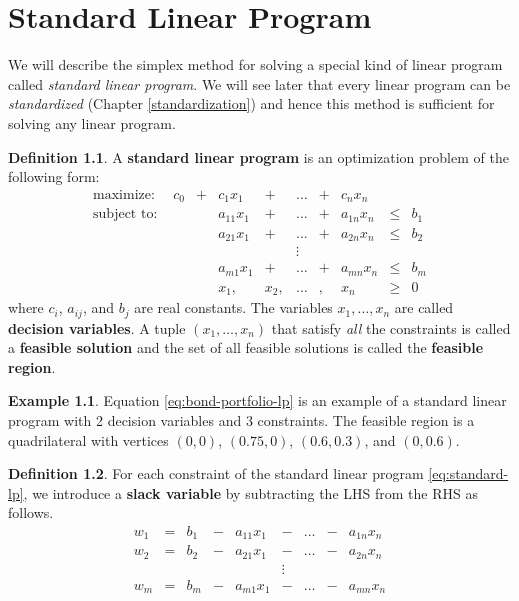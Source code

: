 \documentclass[
]{book}
\theoremstyle{definition}
\newtheorem{definition}{Definition}[chapter]
\theoremstyle{definition}
\newtheorem{example}{Example}[chapter]
\theoremstyle{definition}
\theoremstyle{definition}
\theoremstyle{remark}
\begin{document}
\hypertarget{standard-linear-program}{%
\chapter{Standard Linear Program}\label{standard-linear-program}}

We will describe the simplex method for solving a special kind of linear program called \emph{standard linear program}.
We will see later that every linear program can be \emph{standardized} (Chapter \ref{standardization}) and hence this method is sufficient for solving any linear program.

\begin{definition}
A \textbf{standard linear program} is an optimization problem of the following form:
\begin{equation}
  \begin{array}{lrrrrrrrrr}
    \mbox{maximize: } & c_0 & + & c_1 x_1 & + & \dots & + & c_n x_n & \\
    \mbox{subject to: } 
      & & & a_{11} x_1 & + & \dots & + & a_{1n} x_n & \leq & b_1 \\
      & & & a_{21} x_1 & + & \dots & + & a_{2n} x_n & \leq & b_2 \\
      & & & & & \vdots &  \\
      & & & a_{m1} x_1 & + & \dots & + & a_{mn} x_n & \leq & b_m \\
      & & & x_1, & x_2, & \dots &, & x_n & \geq & 0
  \end{array} 
  \label{eq:standard-lp}
\end{equation}
where \(c_i\), \(a_{ij}\), and \(b_j\) are real constants. The variables \(x_1, \dots, x_n\) are called \textbf{decision variables}. A tuple \((x_1, \dots, x_n)\) that satisfy \emph{all} the constraints is called a \textbf{feasible solution} and the set of all feasible solutions is called the \textbf{feasible region}.
\end{definition}

\begin{example}
Equation \eqref{eq:bond-portfolio-lp} is an example of a standard linear program with 2 decision variables and 3 constraints. The feasible region is a quadrilateral with vertices \((0,0)\), \((0.75, 0)\), \((0.6, 0.3)\), and \((0, 0.6)\).
\end{example}

\begin{definition}
For each constraint of the standard linear program \eqref{eq:standard-lp}, we introduce a \textbf{slack variable} by subtracting the LHS from the RHS as follows.
\begin{equation}
  \begin{array}{lrrrrrrrrr}
      w_1 & = & b_1 & - & a_{11} x_1 & - & \dots & - & a_{1n} x_n \\
      w_2 & = & b_2 & - & a_{21} x_1 & - & \dots & - & a_{2n} x_n \\
      & & & & & \vdots &  \\
      w_m & = & b_m & - & a_{m1} x_1 & - & \dots & - & a_{mn} x_n 
  \end{array} 
  \label{eq:slack-variables-def}
\end{equation}
\end{definition}
\end{document}
